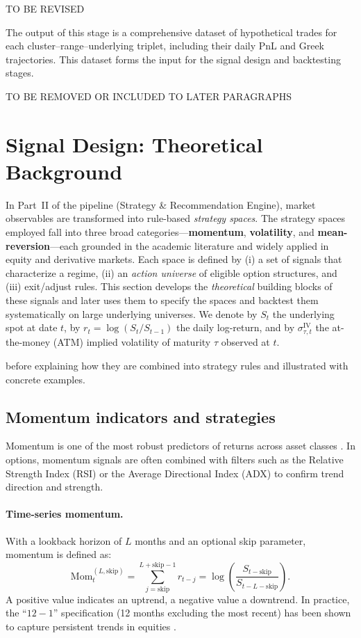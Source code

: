 \documentclass[12pt,a4paper]{report}
\begin{document}
 TO BE REVISED 
 
The output of this stage is a comprehensive dataset of hypothetical trades for each cluster–range–underlying triplet, including their daily PnL and Greek trajectories. This dataset forms the input for the signal design and backtesting stages.



 TO BE REMOVED OR INCLUDED TO LATER PARAGRAPHS


\section{Signal Design: Theoretical Background}

In Part~II of the pipeline (Strategy \& Recommendation Engine), market observables are transformed into rule-based \emph{strategy spaces}. The strategy spaces employed fall into three broad categories—\textbf{momentum}, \textbf{volatility}, and \textbf{mean-reversion}—each grounded in the academic literature and widely applied in equity and derivative markets. Each space is defined by (i) a set of signals that characterize a regime, (ii) an \emph{action universe} of eligible option structures, and (iii) exit/adjust rules. This section develops the \emph{theoretical} building blocks of these signals and later uses them to specify the spaces and backtest them systematically on large underlying universes. We denote by $S_t$ the underlying spot at date $t$, by $r_t=\log(S_t/S_{t-1})$ the daily log-return, and by $\sigma^{\text{IV}}_{\tau,t}$ the at-the-money (ATM) implied volatility of maturity $\tau$ observed at $t$.





before explaining how they are combined into strategy rules and illustrated with concrete examples.


\subsection{Momentum indicators and strategies}

Momentum is one of the most robust predictors of returns across asset classes \citep{jegadeesh1993returns, moskowitz2012time}. In options, momentum signals are often combined with filters such as the Relative Strength Index (RSI) or the Average Directional Index (ADX) to confirm trend direction and strength.

\paragraph{Time-series momentum.}  
With a lookback horizon of $L$ months and an optional skip parameter, momentum is defined as:
\[
\text{Mom}_{t}^{(L,\text{skip})}
= \sum_{j=\text{skip}}^{L+\text{skip}-1} r_{t-j}
= \log\!\left(\frac{S_{t-\text{skip}}}{S_{t-L-\text{skip}}}\right).
\]
A positive value indicates an uptrend, a negative value a downtrend. In practice, the ``$12\!-\!1$'' specification (12 months excluding the most recent) has been shown to capture persistent trends in equities \citep{moskowitz2012time}.
\end{document}
